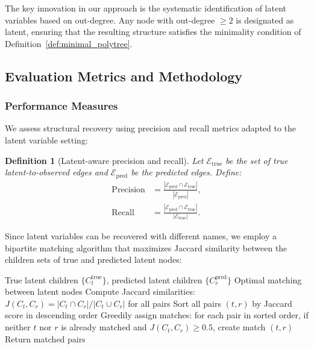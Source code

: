 \documentclass[11pt,a4paper]{article}
\numberwithin{equation}{section}
\newtheorem{definition}[theorem]{Definition}
\begin{document}
The key innovation in our approach is the systematic identification of latent variables based on out-degree. Any node with out-degree $\geq 2$ is designated as latent, ensuring that the resulting structure satisfies the minimality condition of Definition~\ref{def:minimal_polytree}.


\subsection{Evaluation Metrics and Methodology}

\subsubsection{Performance Measures}

We assess structural recovery using precision and recall metrics adapted to the latent variable setting:

\begin{definition}[Latent-aware precision and recall]
Let $\mathcal{E}_{\text{true}}$ be the set of true latent-to-observed edges and $\mathcal{E}_{\text{pred}}$ be the predicted edges. Define:
\begin{align}
\text{Precision} &= \frac{|\mathcal{E}_{\text{pred}} \cap \mathcal{E}_{\text{true}}|}{|\mathcal{E}_{\text{pred}}|}, \\
\text{Recall} &= \frac{|\mathcal{E}_{\text{pred}} \cap \mathcal{E}_{\text{true}}|}{|\mathcal{E}_{\text{true}}|}.
\end{align}
\end{definition}

Since latent variables can be recovered with different names, we employ a bipartite matching algorithm that maximizes Jaccard similarity between the children sets of true and predicted latent nodes:

\begin{algorithm}[H]
\caption{Latent Node Matching}
\label{alg:latent_matching}
\begin{algorithmic}[1]
    \Require True latent children $\{C_t^{\text{true}}\}$, predicted latent children $\{C_r^{\text{pred}}\}$
    \Ensure Optimal matching between latent nodes
    \State Compute Jaccard similarities: $J(C_t, C_r) = |C_t \cap C_r| / |C_t \cup C_r|$ for all pairs
    \State Sort all pairs $(t, r)$ by Jaccard score in descending order
    \State Greedily assign matches: for each pair in sorted order, if neither $t$ nor $r$ is already matched and $J(C_t, C_r) \geq 0.5$, create match $(t, r)$
    \State Return matched pairs
\end{algorithmic}
\end{algorithm}
\end{document}
